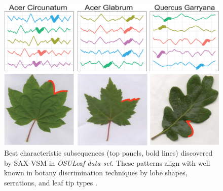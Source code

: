 \begin{figure}[t]
   \centering
   \includegraphics[width=140mm]{figures/AcerCircunatum.eps}
   \caption{Best characteristic subsequences (top panels, bold lines) discovered by SAX-VSM in
      \textit{OSULeaf data set}.
These patterns align with well known in botany discrimination techniques
by lobe shapes, serrations, and leaf tip types \cite{citeulike:12134192}.}
   \label{fig:shapelet-acer-patterns}
\end{figure}

